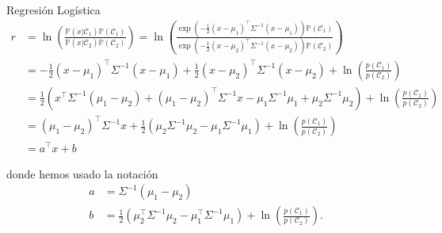 \documentclass[9pt]{beamer}
\begin{document}
\begin{frame}{Regresión Logística}
\begin{align*}
r &= \ln\left(\frac{\mathbb{P}(x|\mathcal{C}_1)\mathbb{P}(\mathcal{C}_1)}{\mathbb{P}(x|\mathcal{C}_2)\mathbb{P}(\mathcal{C}_2)}\right) = \ln\left(\frac{\exp(-\frac{1}{2}(x-\mu_1)^\top \Sigma^{-1}(x-\mu_1))\mathbb{P}(\mathcal{C}_1)}{\exp(-\frac{1}{2}(x-\mu_2)^\top \Sigma^{-1}(x-\mu_2))\mathbb{P}(\mathcal{C}_2)}\right)\\
&= -\frac{1}{2}(x-\mu_1)^\top \Sigma^{-1}(x-\mu_1) +\frac{1}{2}(x-\mu_2)^\top \Sigma^{-1}(x-\mu_2) + \ln\left(\frac{p(\mathcal{C}_1)}{p(\mathcal{C}_2)}\right)\\
&= \frac{1}{2}\left(x^\top\Sigma^{-1}(\mu_1-\mu_2) + (\mu_1-\mu_2)^\top\Sigma^{-1}x - \mu_1\Sigma^{-1}\mu_1 + \mu_2\Sigma^{-1}\mu_2 \right) + \ln\left(\frac{p(\mathcal{C}_1)}{p(\mathcal{C}_2)}\right)\\
&= (\mu_1-\mu_2)^\top\Sigma^{-1}x + \frac{1}{2}\left(\mu_2\Sigma^{-1}\mu_2 - \mu_1\Sigma^{-1}\mu_1 \right)+ \ln\left(\frac{p(\mathcal{C}_1)}{p(\mathcal{C}_2)}\right)\\
&= a^\top x+b
\end{align*} \pause

donde hemos usado la notación
\begin{align*}
a &= \Sigma^{-1}(\mu_1-\mu_2)\\
b &= \frac{1}{2}(\mu_2^\top \Sigma^{-1}\mu_2-\mu_1^\top \Sigma^{-1}\mu_1)
+\ln\left(\frac{p(\mathcal{C}_1)}{p(\mathcal{C}_2)}\right). 
\end{align*}

\end{frame}
\end{document}
